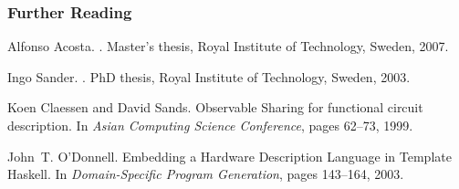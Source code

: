 \documentclass{beamer}
\begin{document}
\begin{frame}
  \frametitle<presentation>{Further Reading}
    
    

 
    

  
%  
%  

\begin{thebibliography}{1}



Alfonso Acosta.
.
\newblock Master's thesis, Royal Institute of Technology, Sweden, 2007.


Ingo Sander.
.
\newblock PhD thesis, Royal Institute of Technology, Sweden, 2003.

Koen Claessen and David Sands.
\newblock Observable Sharing for functional circuit description.
\newblock In {\em Asian Computing Science Conference}, pages 62--73, 1999.


John~T. O'Donnell.
\newblock Embedding a Hardware Description Language in Template Haskell.
\newblock In {\em Domain-Specific Program Generation}, pages 143--164, 2003.



\end{thebibliography}


\end{frame}
\end{document}
